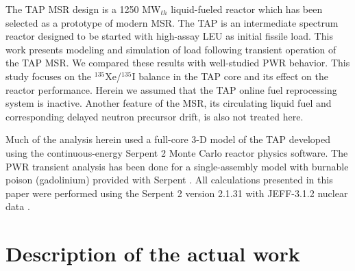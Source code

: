 \documentclass{anstrans}
\begin{document}
The \gls{TAP} \gls{MSR} design is a 1250 MW$_{th}$ liquid-fueled reactor which 
has been selected as a prototype of modern \gls{MSR}. The \gls{TAP} is an 
intermediate spectrum reactor designed to be started with high-assay \gls{LEU}
 as initial fissile load. This work presents modeling and simulation of 
load following transient operation of the \gls{TAP} \gls{MSR}. We 
compared these results with well-studied \gls{PWR} behavior. This study 
focuses on the $^{135}$Xe/$^{135}$I balance in the \gls{TAP} core and its 
effect on the reactor performance. Herein we assumed that the \gls{TAP} 
online fuel reprocessing system is inactive. Another feature of the \gls{MSR}, 
its circulating liquid fuel and corresponding delayed neutron precursor drift, 
is also not treated here.

Much of the analysis herein used a full-core 3-D model of the \gls{TAP}  
developed using the continuous-energy Serpent 2 Monte Carlo reactor physics 
software. The \gls{PWR} transient analysis has been done for a single-assembly 
model with burnable poison (gadolinium) provided with Serpent 
\cite{leppanen_serpent_2015}. All calculations presented in this paper were 
performed using the Serpent 2 version 2.1.31 with JEFF-3.1.2 nuclear data 
\cite{oecd/nea_jeff-3.1.2_2014}.
\section{Description of the actual work}
\end{document}
